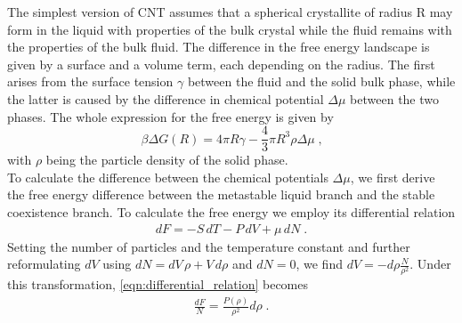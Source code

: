 The simplest version of CNT assumes that a spherical crystallite of radius R may form in the liquid with properties of the bulk crystal while the fluid remains with the properties of the bulk fluid. The difference in the free energy landscape is given by a surface and a volume term, each depending on the radius. The first arises from the surface tension $\gamma$ between the fluid and the solid bulk phase, while the latter is caused by the difference in chemical potential $\Delta \mu$ between the two phases. The whole expression for the free energy is given by
\begin{equation}
\label{eqn:free_energy}
\beta \Delta G(R) =4 \pi R \gamma -\frac{4}{3} \pi R^3 \rho \Delta \mu  \; \text{,}
\end{equation}
with $\rho$ being the particle density of the solid phase.\\

To calculate the difference between the chemical potentials $\Delta \mu $, we first derive the free energy difference between the metastable liquid branch and the stable coexistence branch. To calculate the free energy we employ its differential relation
\begin{align}
\label{eqn:differential_relation}
dF = -S  \, dT -P \, dV + \mu  \, dN \; \text{.}
\end{align}
Setting the number of particles and the temperature constant and further reformulating $dV$ using \linebreak[1] $dN = dV  \, \rho + V  \, d\rho  $ and $dN = 0 $, we find $ dV = -d\rho \frac{N}{\rho^2}$. Under this transformation, \autoref{eqn:differential_relation} becomes
\begin{align}
\label{eqn:df_relation}
\frac{dF}{N} = \frac{P(\rho)}{\rho^2} d\rho \; \text{.}
\end{align}

